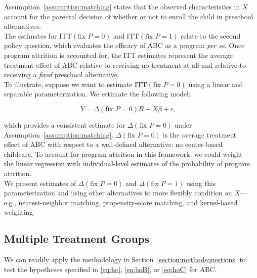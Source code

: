 \noindent Assumption~\ref{assumption:matching} states that the observed characteristics in $X$ account for the parental decision of whether or not to enroll the child in preschool alternatives.\\

\noindent The estimates for $\text{ITT} \left( \text{fix } P = 0 \right) $ and $\text{ITT} \left( \text{fix } P = 1 \right)$ relate to the second policy question, which evaluates the efficacy of ABC as a program \emph{per se}. Once program attrition is accounted for, the ITT estimates represent the average treatment effect of ABC relative to receiving no treatment at all and relative to receiving a \textit{fixed} preschool alternative.\\

\noindent To illustrate, suppose we want to estimate $\text{ITT} \left( \text{fix } P = 0 \right)$ using a linear and separable parameterization. We estimate the following model: 

\begin{equation}
Y = \Delta \left( \text{fix } P = 0 \right) R + X \beta + \varepsilon, 
\end{equation}

\noindent which provides a consistent estimate for $\Delta \left( \text{fix } P = 0 \right)$ under Assumption~\ref{assumption:matching}. $\Delta \left( \text{fix } P = 0 \right)$ is the average treatment effect of ABC with respect to a well-defined alternative: no center-based childcare. To account for program attrition in this framework, we could weight the linear regression with individual-level estimates of the probability of program attrition.\\

\noindent We present estimates of $\Delta \left( \text{fix } P = 0 \right)$ and $\Delta \left( \text{fix } P = 1 \right)$ using this parameterization and using other alternatives to more flexibly  condition on $X$---e.g., nearest-neighbor matching, propensity-score matching, and kernel-based weighting.

\subsection{Multiple Treatment Groups}

\noindent We can readily apply the methodology in Section~\ref{section:methodsquestions} to test the hypotheses specified in \eqref{eq:ho}, \eqref{eq:hoB}, or \eqref{eq:hoC} for ABC.\\

